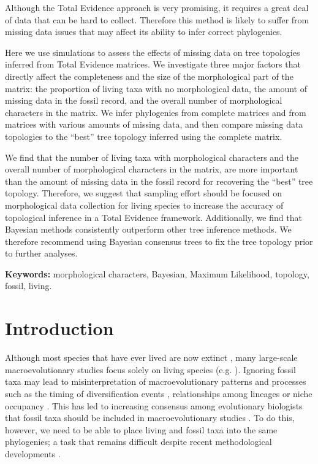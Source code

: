 Although the Total Evidence approach is very promising, it requires a great deal of data that can be hard to collect.
Therefore this method is likely to suffer from missing data issues that may affect its ability to infer correct phylogenies.

Here we use simulations to assess the effects of missing data on tree topologies inferred from Total Evidence matrices.
We investigate three major factors that directly affect the completeness and the size of the morphological part of the matrix: the proportion of living taxa with no morphological data, the amount of missing data in the fossil record, and the overall number of morphological characters in the matrix.
We infer phylogenies from complete matrices and from matrices with various amounts of missing data, and then compare missing data topologies to the ``best'' tree topology inferred using the complete matrix.

We find that the number of living taxa with morphological characters and the overall number of morphological characters in the matrix, are more important than the amount of missing data in the fossil record for recovering the ``best'' tree topology.
Therefore, we suggest that sampling effort should be focused on morphological data collection for living species to increase the accuracy of topological inference in a Total Evidence framework.
Additionally, we find that Bayesian methods consistently outperform other tree inference methods.
We therefore recommend using Bayesian consensus trees to fix the tree topology prior to further analyses.

\bigskip
\noindent
\textbf{Keywords:} morphological characters, Bayesian, Maximum Likelihood, topology, fossil, living.

%
%

\newpage
\section{Introduction}
Although most species that have ever lived are now extinct \citep{novacek1992ext,raup1993extinction}, many large-scale macroevolutionary studies focus solely on living species (e.g. \citealp{meredithimpacts2011,jetzthe2012}).
Ignoring fossil taxa may lead to misinterpretation of macroevolutionary patterns and processes such as the timing of diversification events \citep[e.g.][]{pyrondivergence2011}, relationships among lineages \citep[e.g.][]{manosphylogeny2007} or niche occupancy \citep[e.g.][]{pearmanniche2008}.
This has led to increasing consensus among evolutionary biologists that fossil taxa should be included in macroevolutionary studies \citep{jacksonwhat2006,quentaldiversity2010,dietlconservation2011,slaterunifying2013,fritzdiversity2013}.
To do this, however, we need to be able to place living and fossil taxa into the same phylogenies; a task that remains difficult despite recent methodological developments \citep[e.g.][]{pyrondivergence2011,ronquista2012,BEASTmaster}.


